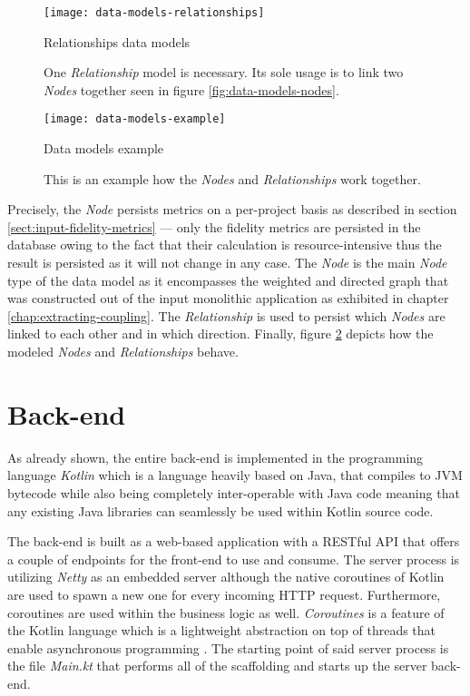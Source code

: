 \documentclass[12pt,a4paper]{report}
\begin{document}
\begin{figure}[htbp]
\centering
\texttt{[image: data-models-relationships]}
\caption{Relationships data models}
\caption*{
  One \textit{Relationship} model is necessary. Its sole usage is to link
  two  \textit{Nodes} together seen in figure \ref{fig:data-models-nodes}.
}
\label{fig:data-models-relationships}
\end{figure}

\begin{figure}[htbp]
\centering
\texttt{[image: data-models-example]}
\caption{Data models example}
\caption*{
  This is an example how the \textit{Nodes} and \textit{Relationships} work together.
}
\label{fig:data-models-example}
\end{figure}

Precisely, the  \textit{Node} persists metrics on a per\hyp project basis
as described in section \ref{sect:input-fidelity-metrics} --- only the fidelity
metrics are persisted in the database owing to the fact that their calculation is
resource\hyp intensive thus the result is persisted as it will not change in any case.
The  \textit{Node} is the main \textit{Node} type of the data model as it
encompasses the weighted and directed graph that was constructed out of the input
monolithic application as exhibited in chapter \ref{chap:extracting-coupling}.
The  \textit{Relationship} is used to persist which
 \textit{Nodes} are linked to each other and in which direction.
Finally, figure \ref{fig:data-models-example} depicts how the modeled
\textit{Nodes} and \textit{Relationships} behave.



\section{Back-end} \label{sect:implementation-back-end}

As already shown, the entire back-end is implemented in the programming language
\textit{Kotlin} which is a language heavily based on Java, that compiles to JVM
bytecode while also being completely inter-operable with Java code meaning that
any existing Java libraries can seamlessly be used within Kotlin source code.

The back-end is built as a web-based application with a RESTful API that offers
a couple of endpoints for the front-end to use and consume.
The server process is utilizing \textit{Netty} \cite{ktor-netty} as an embedded
server although the native coroutines of Kotlin are used to spawn a new one for
every incoming HTTP request.
Furthermore, coroutines are used within the business logic as well.
\textit{Coroutines} is a feature of the Kotlin language which is a lightweight
abstraction on top of threads that enable asynchronous programming \cite{kotlin-coroutines}.
The starting point of said server process is the file \textit{Main.kt} that
performs all of the scaffolding and starts up the server back-end.
\end{document}
